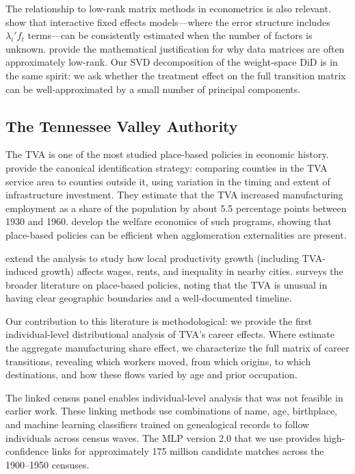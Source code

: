 \documentclass[12pt]{article}
\begin{document}
The relationship to low-rank matrix methods in econometrics is also relevant. \citet{moon2015linear} show that interactive fixed effects models---where the error structure includes $\lambda_i' f_t$ terms---can be consistently estimated when the number of factors is unknown. \citet{udell2019big} provide the mathematical justification for why data matrices are often approximately low-rank. Our SVD decomposition of the weight-space DiD is in the same spirit: we ask whether the treatment effect on the full transition matrix can be well-approximated by a small number of principal components.

\subsection{The Tennessee Valley Authority}

The TVA is one of the most studied place-based policies in economic history. \citet{klineMoretti2014local} provide the canonical identification strategy: comparing counties in the TVA service area to counties outside it, using variation in the timing and extent of infrastructure investment. They estimate that the TVA increased manufacturing employment as a share of the population by about 5.5 percentage points between 1930 and 1960. \citet{klineMoretti2014} develop the welfare economics of such programs, showing that place-based policies can be efficient when agglomeration externalities are present.

\citet{hornbeckMoretti2022} extend the analysis to study how local productivity growth (including TVA-induced growth) affects wages, rents, and inequality in nearby cities. \citet{neumark2015place} surveys the broader literature on place-based policies, noting that the TVA is unusual in having clear geographic boundaries and a well-documented timeline.

Our contribution to this literature is methodological: we provide the first individual-level distributional analysis of TVA's career effects. Where \citet{klineMoretti2014local} estimate the aggregate manufacturing share effect, we characterize the full matrix of career transitions, revealing which workers moved, from which origins, to which destinations, and how these flows varied by age and prior occupation.

The linked census panel \citep{abramitzky2014nation, abramitzky2019automated, price2021mlp} enables individual-level analysis that was not feasible in earlier work. These linking methods use combinations of name, age, birthplace, and machine learning classifiers trained on genealogical records to follow individuals across census waves. The MLP version 2.0 that we use provides high-confidence links for approximately 175 million candidate matches across the 1900--1950 censuses.
\end{document}
